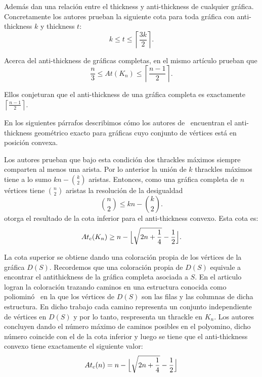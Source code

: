 Además dan una relación entre el thickness y anti-thickness de cualquier
gráfica. Concretamente los autores prueban la siguiente cota para toda gráfica
con anti-thickness $k$ y thickness $t$:
\[ k \leq t \leq \left\lceil \frac{3k}{2}\right\rceil .\]

Acerca del anti-thickness de gráficas completas, en el mismo artículo
prueban que \[ \frac{n}{3} \leq  At(K_n) \leq \left\lceil \frac{n-1}{2} \right\rceil . \]

Ellos conjeturan que el anti-thickness de una gráfica completa es
exactamente $\left\lceil \frac{n-1}{2} \right\rceil$.

En los siguientes párrafos describimos cómo los autores de~\cite{Fabila-Monroy2018}
encuentran el anti-thickness geométrico exacto para gráficas cuyo conjunto
de vértices está en posición convexa.

Los autores prueban que bajo esta condición dos thrackles máximos siempre
comparten al menos una arista. Por lo anterior la unión de $k$ thrackles máximos tiene
a lo sumo $kn - \binom{k}{2}$ aristas. Entonces, como una gráfica completa de $n$
vértices tiene $\binom{n}{2}$ aristas la resolución de la desigualdad
\[ \binom{n}{2} \leq kn - \binom{k}{2} .\]
otorga el resultado de la cota inferior para el anti-thickness convexo. Esta cota es:
\[ At_c(K_n) \geq n - \Bigl\lfloor \sqrt{2n + \frac{1}{4}} - \frac{1}{2} \Bigr\rfloor. \]

La cota superior se obtiene dando una coloración propia de los vértices de la gráfica
$D(S)$. Recordemos que una coloración propia de $D(S)$ equivale a encontrar el
antithickness de la gráfica completa asociada a $S$.
En el articulo logran la coloración trazando caminos en una
estructura conocida como poliominó~\cite{Fabila-Monroy2018-poly}
en la que los vértices de $D(S)$ son las filas y las columnas de dicha estructura.
En dicho trabajo cada camino representa un conjunto independiente de vértices en
 $D(S)$ y por lo tanto, respresenta un thrackle en $K_n$.
Los autores concluyen dando el número máximo de caminos posibles en el
polyomino, dicho número coincide con el de la cota inferior y luego se tiene
que el anti-thickness convexo tiene exactamente el siguiente valor:
\[ At_c(n) = n - \Bigl\lfloor \sqrt{2n + \frac{1}{4}} - \frac{1}{2} \Bigr\rfloor \]

